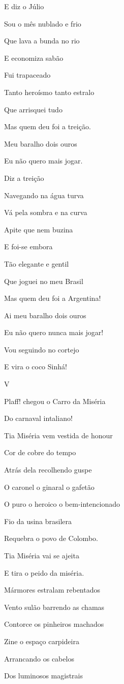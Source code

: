 E diz o Júlio

Sou o mês nublado e frio

Que lava a bunda no rio

E economiza sabão

Fui trapaceado

Tanto heroísmo tanto estralo

Que arrisquei tudo

Mas quem deu foi a treição.

Meu baralho dois ouros

Eu não quero mais jogar.

Diz a treição

Navegando na água turva

Vá pela sombra e na curva

Apite que nem buzina

E foi-se embora

Tão elegante e gentil

Que joguei no meu Brasil

Mas quem deu foi a Argentina!

Ai meu baralho dois ouros

Eu não quero nunca mais jogar!

Vou seguindo no cortejo

E vira o coco Sinhá!

V

Plaff! chegou o Carro da Miséria

Do carnaval intaliano!

Tia Miséria vem vestida de honour

Cor de cobre do tempo

Atrás dela recolhendo guspe

O caronel o ginaral o gafetão

O puro o heroico o bem-intencionado

Fio da usina brasilera

Requebra o povo de Colombo.

Tia Miséria vai se ajeita

E tira o peido da miséria.

Mármores estralam rebentados

Vento sulão barrendo as chamas

Contorce os pinheiros machados

Zine o espaço carpideira

Arrancando os cabelos

Dos luminosos magistrais

